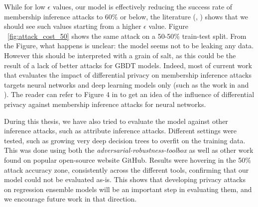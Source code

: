 While for low $\epsilon$ values, our model is effectively reducing the success rate of membership inference attacks to $60\%$ or below, the literature (\cite{chen}, \cite{label_only}) shows that we should see such values starting from a higher $\epsilon$ value. Figure ~\ref{fig:attack_cost_50} shows the same attack on a 50-50\% train-test split. From the Figure, what happens is unclear: the model seems not to be leaking any data. However this should be interpreted with a grain of salt, as this could be the result of a lack of better attacks for GBDT models. Indeed, most of current work that evaluates the impact of differential privacy on membership inference attacks targets neural networks and deep learning models only (such as the work in \cite{chen} and \cite{dp_mia}). The reader can refer to Figure 4 in \cite{ref_attack} to get an idea of the influence of differential privacy against membership inference attacks for neural networks.

During this thesis, we have also tried to evaluate the model against other inference attacks, such as attribute inference attacks. Different settings were tested, such as growing very deep decision trees to overfit on the training data. This was done using both the \textit{adversarial-robustness-toolbox} as well as other work found on popular open-source website GitHub. Results were hovering in the 50\% attack accuracy zone, consistently across the different tools, confirming that our model could not be evaluated as-is. This shows that developing privacy attacks on regression ensemble models will be an important step in evaluating them, and we encourage future work in that direction.